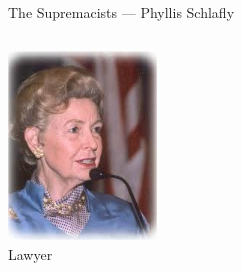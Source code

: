 \begin{frame}{The Supremacists --- Phyllis Schlafly}
\begin{columns}[onlytextwidth]
            \centering
            \includegraphics[width=0.75\textwidth]{img/phyllis-schlafly.png} \\
            Lawyer \\
    \end{columns}
\end{frame}

